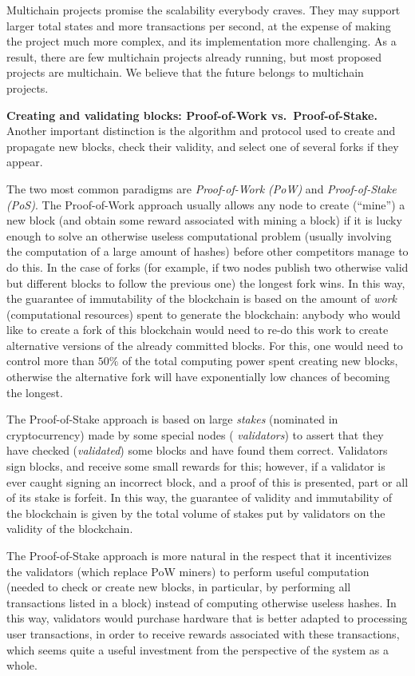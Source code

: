 \documentclass[12pt,oneside]{article}
\def\makepoint#1{\medbreak\noindent{\bf #1.\ }}
\def\nxsubpoint{\refstepcounter{subsubsection}%
  \smallbreak\makepoint{\thesubsubsection}}
\def\embt(#1.){\textbf{#1.}}
\begin{document}
Multichain projects promise the scalability everybody craves. They may
support larger total states and more transactions per second, at the
expense of making the project much more complex, and its
implementation more challenging. As a result, there are few multichain
projects already running, but most proposed projects are
multichain. We believe that the future belongs to multichain projects.

\nxsubpoint\label{sp:pow.pos} \embt(Creating and validating blocks:
Proof-of-Work vs.\ Proof-of-Stake.)  Another important distinction is
the algorithm and protocol used to create and propagate new blocks,
check their validity, and select one of several forks if they appear.

The two most common paradigms are {\em Proof-of-Work (PoW)} and {\em
  Proof-of-Stake (PoS)}. The Proof-of-Work approach usually allows any
node to create (``mine'') a new block (and obtain some reward
associated with mining a block) if it is lucky enough to solve an
otherwise useless computational problem (usually involving the
computation of a large amount of hashes) before other competitors
manage to do this. In the case of forks (for example, if two nodes
publish two otherwise valid but different blocks to follow the
previous one) the longest fork wins. In this way, the guarantee of
immutability of the blockchain is based on the amount of {\em work\/}
(computational resources) spent to generate the blockchain: anybody
who would like to create a fork of this blockchain would need to re-do
this work to create alternative versions of the already committed
blocks. For this, one would need to control more than $50\%$ of the
total computing power spent creating new blocks, otherwise the
alternative fork will have exponentially low chances of becoming the
longest.

The Proof-of-Stake approach is based on large {\em stakes\/}
(nominated in cryptocurrency) made by some special nodes ({\em
  validators}) to assert that they have checked ({\em validated\/})
some blocks and have found them correct. Validators sign blocks, and
receive some small rewards for this; however, if a validator is ever
caught signing an incorrect block, and a proof of this is presented,
part or all of its stake is forfeit. In this way, the guarantee of
validity and immutability of the blockchain is given by the total
volume of stakes put by validators on the validity of the blockchain.

The Proof-of-Stake approach is more natural in the respect that it
incentivizes the validators (which replace PoW miners) to perform
useful computation (needed to check or create new blocks, in
particular, by performing all transactions listed in a block) instead
of computing otherwise useless hashes. In this way, validators would
purchase hardware that is better adapted to processing user
transactions, in order to receive rewards associated with these
transactions, which seems quite a useful investment from the
perspective of the system as a whole.
\end{document}
